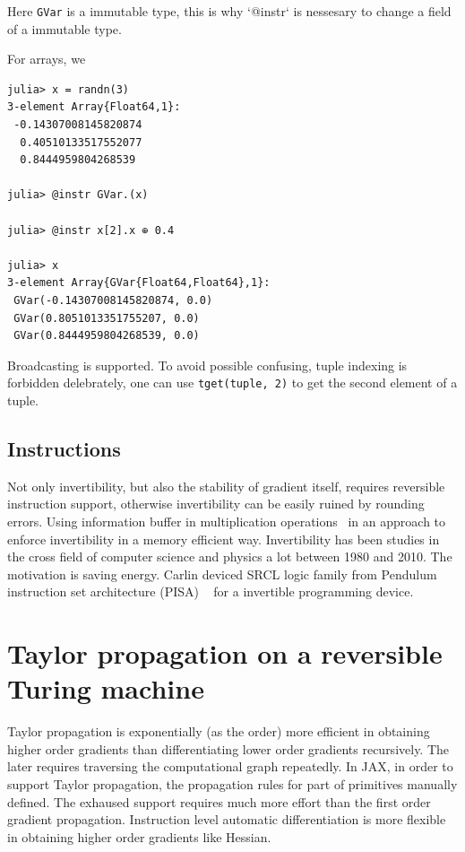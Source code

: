 \documentclass{article}
\newcommand{\<}{\langle}
\renewcommand{\>}{\rangle}
\begin{document}
Here \texttt{GVar} is a immutable type, this is why `@instr` is nessesary to change a field of a immutable type.

For arrays, we 

\begin{minipage}{.44\textwidth}
\begin{lstlisting}
julia> x = randn(3)
3-element Array{Float64,1}:
 -0.14307008145820874
  0.40510133517552077
  0.8444959804268539 

julia> @instr GVar.(x)

julia> @instr x[2].x ⊕ 0.4

julia> x
3-element Array{GVar{Float64,Float64},1}:
 GVar(-0.14307008145820874, 0.0)
 GVar(0.8051013351755207, 0.0)  
 GVar(0.8444959804268539, 0.0)
\end{lstlisting}
\end{minipage}

Broadcasting is supported. To avoid possible confusing, tuple indexing is forbidden delebrately, one can use \texttt{tget(tuple, 2)} to get the second element of a tuple.

\subsection{Instructions}
Not only invertibility, but also the stability of gradient itself, requires reversible instruction support, otherwise invertibility can be easily ruined by rounding errors.
Using information buffer in multiplication operations~\cite{Maclaurin2015} in an approach to enforce invertibility in a memory efficient way.
Invertibility has been studies in the cross field of computer science and physics a lot between 1980 and 2010.
The motivation is saving energy.
Carlin deviced SRCL logic family from Pendulum instruction set architecture (PISA) ~\cite{Vieri1999} for a invertible programming device.

\section{Taylor propagation on a reversible Turing machine}
Taylor propagation is exponentially (as the order) more efficient in obtaining higher order gradients than differentiating lower order gradients recursively.
The later requires traversing the computational graph repeatedly.
In JAX, in order to support Taylor propagation, the propagation rules for part of primitives manually defined.
The exhaused support requires much more effort than the first order gradient propagation.
Instruction level automatic differentiation is more flexible in obtaining higher order gradients like Hessian.
\end{document}
